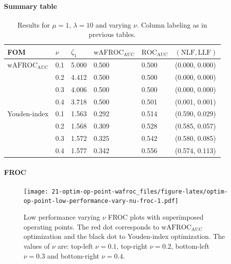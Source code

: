 \documentclass[
]{book}
\begin{document}
\hypertarget{summary-table-9}{%
\paragraph{Summary table}\label{summary-table-9}}

\begin{table}

\caption{\label{tab:optim-op-point-low-performance-vary-nu-table}Results for $\mu = 1$, $\lambda = 10$ and varying $\nu$. Column labeling as in previous tables.}
\centering
\fontsize{10}{12}\selectfont
\begin{tabular}[t]{llllll}
\toprule
FOM & $\nu$ & $\zeta_1$ & $\text{wAFROC}_\text{AUC}$ & $\text{ROC}_\text{AUC}$ & $\left( \text{NLF}, \text{LLF}\right)$\\
\midrule
$\text{wAFROC}_\text{AUC}$ & 0.1 & 5.000 & 0.500 & 0.500 & (0.000, 0.000)\\
 & 0.2 & 4.412 & 0.500 & 0.500 & (0.000, 0.000)\\
 & 0.3 & 4.006 & 0.500 & 0.500 & (0.000, 0.000)\\
 & 0.4 & 3.718 & 0.500 & 0.501 & (0.001, 0.001)\\
Youden-index & 0.1 & 1.563 & 0.292 & 0.514 & (0.590, 0.029)\\
\addlinespace
 & 0.2 & 1.568 & 0.309 & 0.528 & (0.585, 0.057)\\
 & 0.3 & 1.572 & 0.325 & 0.542 & (0.580, 0.085)\\
 & 0.4 & 1.577 & 0.342 & 0.556 & (0.574, 0.113)\\
\bottomrule
\end{tabular}
\end{table}

\hypertarget{froc-10}{%
\paragraph{FROC}\label{froc-10}}

\begin{figure}
\centering
\texttt{[image: 21-optim-op-point-wafroc\_files/figure-latex/optim-op-point-low-performance-vary-nu-froc-1.pdf]}
\caption{\label{fig:optim-op-point-low-performance-vary-nu-froc}Low performance varying \(\nu\) FROC plots with superimposed operating points. The red dot corresponds to \(\text{wAFROC}_\text{AUC}\) optimization and the black dot to Youden-index optimization. The values of \(\nu\) are: top-left \(\nu = 0.1\), top-right \(\nu = 0.2\), bottom-left \(\nu = 0.3\) and bottom-right \(\nu = 0.4\).}
\end{figure}
\end{document}
